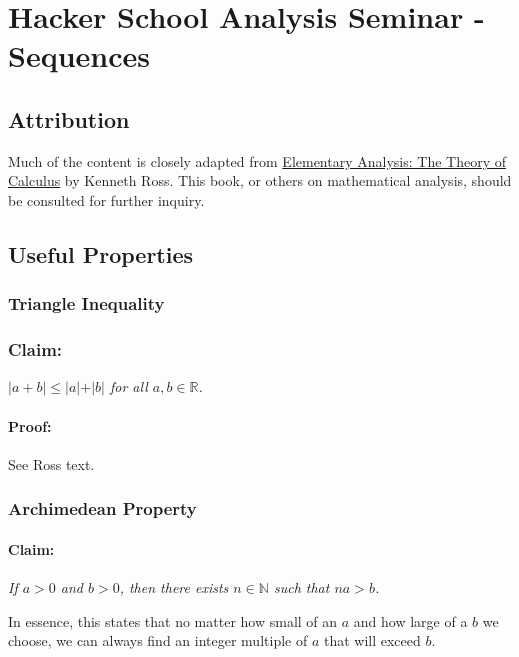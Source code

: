 \documentclass[]{article}
\author{}
\date{}
\begin{document}
\section{Hacker School Analysis Seminar - Sequences}

\subsection{Attribution}

Much of the content is closely adapted from
\href{http://books.google.com/books/about/Elementary_Analysis.html?id=ZDaSnKr_k5sC}{Elementary
Analysis: The Theory of Calculus} by Kenneth Ross. This book, or others
on mathematical analysis, should be consulted for further inquiry.

\subsection{Useful Properties}

\subsubsection{Triangle Inequality}

\subsubsection{Claim:}

\emph{$\vert a + b\vert  \le \vert a\vert  + \vert b\vert $ for all
$a,b \in \mathbb{R}$.}

\paragraph{Proof:}

See Ross text.

\subsubsection{Archimedean Property}

\paragraph{Claim:}

\emph{If $a>0$ and $b>0$, then there exists $n \in \mathbb{N}$ such that
$na > b$.}

In essence, this states that no matter how small of an $a$ and how large
of a $b$ we choose, we can always find an integer multiple of $a$ that
will exceed $b$.
\end{document}
